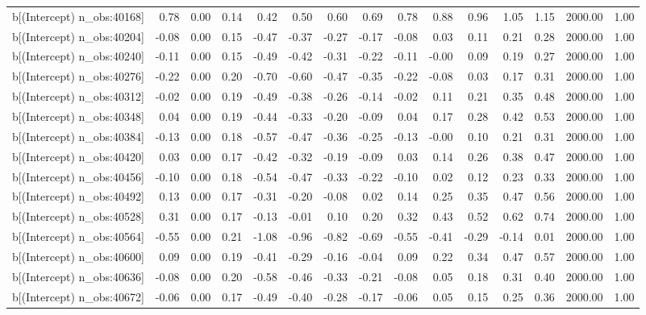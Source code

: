 \begin{table}[ht]
\begin{tabular}{rrrrrrrrrrrrrrr}
  b[(Intercept) n\_obs:40168] & 0.78 & 0.00 & 0.14 & 0.42 & 0.50 & 0.60 & 0.69 & 0.78 & 0.88 & 0.96 & 1.05 & 1.15 & 2000.00 & 1.00 \\ 
  b[(Intercept) n\_obs:40204] & -0.08 & 0.00 & 0.15 & -0.47 & -0.37 & -0.27 & -0.17 & -0.08 & 0.03 & 0.11 & 0.21 & 0.28 & 2000.00 & 1.00 \\ 
  b[(Intercept) n\_obs:40240] & -0.11 & 0.00 & 0.15 & -0.49 & -0.42 & -0.31 & -0.22 & -0.11 & -0.00 & 0.09 & 0.19 & 0.27 & 2000.00 & 1.00 \\ 
  b[(Intercept) n\_obs:40276] & -0.22 & 0.00 & 0.20 & -0.70 & -0.60 & -0.47 & -0.35 & -0.22 & -0.08 & 0.03 & 0.17 & 0.31 & 2000.00 & 1.00 \\ 
  b[(Intercept) n\_obs:40312] & -0.02 & 0.00 & 0.19 & -0.49 & -0.38 & -0.26 & -0.14 & -0.02 & 0.11 & 0.21 & 0.35 & 0.48 & 2000.00 & 1.00 \\ 
  b[(Intercept) n\_obs:40348] & 0.04 & 0.00 & 0.19 & -0.44 & -0.33 & -0.20 & -0.09 & 0.04 & 0.17 & 0.28 & 0.42 & 0.53 & 2000.00 & 1.00 \\ 
  b[(Intercept) n\_obs:40384] & -0.13 & 0.00 & 0.18 & -0.57 & -0.47 & -0.36 & -0.25 & -0.13 & -0.00 & 0.10 & 0.21 & 0.31 & 2000.00 & 1.00 \\ 
  b[(Intercept) n\_obs:40420] & 0.03 & 0.00 & 0.17 & -0.42 & -0.32 & -0.19 & -0.09 & 0.03 & 0.14 & 0.26 & 0.38 & 0.47 & 2000.00 & 1.00 \\ 
  b[(Intercept) n\_obs:40456] & -0.10 & 0.00 & 0.18 & -0.54 & -0.47 & -0.33 & -0.22 & -0.10 & 0.02 & 0.12 & 0.23 & 0.33 & 2000.00 & 1.00 \\ 
  b[(Intercept) n\_obs:40492] & 0.13 & 0.00 & 0.17 & -0.31 & -0.20 & -0.08 & 0.02 & 0.14 & 0.25 & 0.35 & 0.47 & 0.56 & 2000.00 & 1.00 \\ 
  b[(Intercept) n\_obs:40528] & 0.31 & 0.00 & 0.17 & -0.13 & -0.01 & 0.10 & 0.20 & 0.32 & 0.43 & 0.52 & 0.62 & 0.74 & 2000.00 & 1.00 \\ 
  b[(Intercept) n\_obs:40564] & -0.55 & 0.00 & 0.21 & -1.08 & -0.96 & -0.82 & -0.69 & -0.55 & -0.41 & -0.29 & -0.14 & 0.01 & 2000.00 & 1.00 \\ 
  b[(Intercept) n\_obs:40600] & 0.09 & 0.00 & 0.19 & -0.41 & -0.29 & -0.16 & -0.04 & 0.09 & 0.22 & 0.34 & 0.47 & 0.57 & 2000.00 & 1.00 \\ 
  b[(Intercept) n\_obs:40636] & -0.08 & 0.00 & 0.20 & -0.58 & -0.46 & -0.33 & -0.21 & -0.08 & 0.05 & 0.18 & 0.31 & 0.40 & 2000.00 & 1.00 \\ 
  b[(Intercept) n\_obs:40672] & -0.06 & 0.00 & 0.17 & -0.49 & -0.40 & -0.28 & -0.17 & -0.06 & 0.05 & 0.15 & 0.25 & 0.36 & 2000.00 & 1.00 \\ 

\end{tabular}
\end{table}
